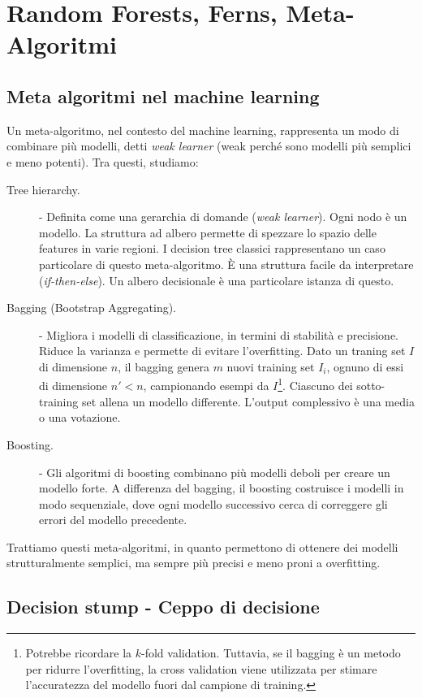 \chapter{Random Forests, Ferns, Meta-Algoritmi}

\section{Meta algoritmi nel machine learning}
Un meta-algoritmo, nel contesto del machine learning, rappresenta un modo di combinare più modelli, detti \textit{weak learner} (weak perché sono modelli più semplici e meno potenti). Tra questi, studiamo:
\begin{description}
	\item[Tree hierarchy.] - Definita come una gerarchia di domande (\textit{weak learner}). Ogni nodo è un modello. La struttura ad albero permette di spezzare lo spazio delle features in varie regioni. I decision tree classici rappresentano un caso particolare di questo meta-algoritmo. È una struttura facile da interpretare (\textit{if-then-else}). Un albero decisionale è una particolare istanza di questo.
	\item[Bagging (Bootstrap Aggregating).] -  Migliora i modelli di classificazione, in termini di stabilità e precisione. Riduce la varianza e permette di evitare l'overfitting.
	Dato un traning set $I$ di dimensione $n$, il bagging genera $m$ nuovi training set $I_i$, ognuno di essi di dimensione $n' < n$, campionando esempi da $I$\footnote{Potrebbe ricordare la $k$-fold validation. Tuttavia, se il bagging  è un metodo per ridurre l'overfitting, la cross validation viene utilizzata per stimare l'accuratezza del modello fuori dal campione di training.}. Ciascuno dei sotto-training set allena un modello differente. L'output complessivo è una media o una votazione.
	\item[Boosting.] - Gli algoritmi di boosting combinano più modelli deboli per creare un modello forte. A differenza del bagging, il boosting costruisce i modelli in modo sequenziale, dove ogni modello successivo cerca di correggere gli errori del modello precedente.
\end{description}

\bigskip

Trattiamo questi meta-algoritmi, in quanto permettono di ottenere dei modelli strutturalmente semplici, ma sempre più precisi e meno proni a overfitting.

\section{Decision stump - Ceppo di decisione}

